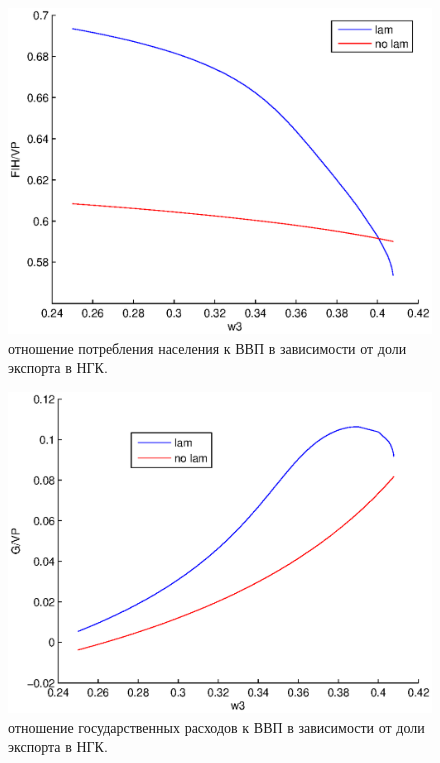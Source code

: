 \documentclass[12pt]{article}
\theoremstyle{rusdef}
\begin{document}
\begin{figure}[h!]
	\centering
	\includegraphics[scale=0.8]{pics/w3_FIH-VP.eps}
	\caption{отношение потребления населения к ВВП в зависимости от доли экспорта в
	НГК.}
\end{figure}
\begin{figure}[h!]
	\centering
	\includegraphics[scale=0.8]{pics/w3_G-VP.eps}
	\caption{отношение государственных расходов к ВВП в зависимости от доли экспорта
		в НГК.}
\end{figure}
\end{document}
